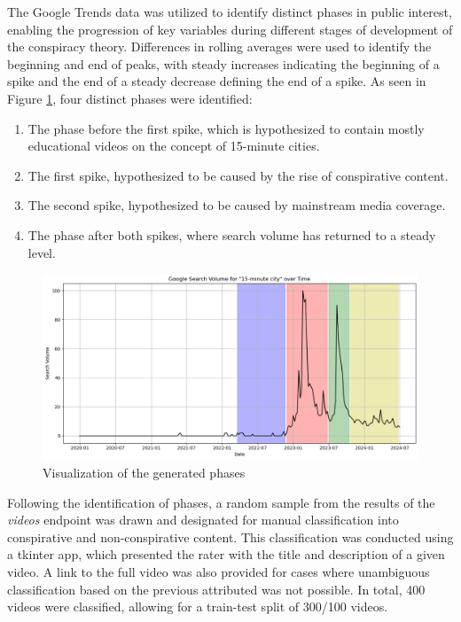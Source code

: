 \documentclass[fontsize=11pt, parskip=half]{scrartcl}
\begin{document}
    The Google Trends data  was utilized to identify distinct phases in public interest, enabling the progression of key variables during different stages of development of the conspiracy theory. Differences in rolling averages were used to identify the beginning and end of peaks, with steady increases indicating the beginning of a spike and the end of a steady decrease defining the end of a spike. As seen in Figure \ref{fig:gtrends_phases}, four distinct phases were identified: 
    \begin{enumerate}
        \item The phase before the first spike, which is hypothesized to contain mostly educational videos on the concept of 15-minute cities.
        \item The first spike, hypothesized to be caused by the rise of conspirative content.
        \item The second spike, hypothesized to be caused by mainstream media coverage.
        \item The phase after both spikes, where search volume has returned to a steady level.
    \end{enumerate}

    \begin{figure}{}
        \centering
        \setlength\intextsep{0pt}
        \includegraphics[width=0.8 \textwidth]{img/gtrends_phases.png}
        \vspace{-5pt}
        \caption{Visualization of the generated phases}
        \vspace{-10pt}
        \label{fig:gtrends_phases}
    \end{figure}

    Following the identification of phases, a random sample from the results of the \textit{videos} endpoint was drawn and designated for manual classification into conspirative and non-conspirative content. This classification was conducted using a tkinter app, which presented the rater with the title and description of a given video. A link to the full video was also provided for cases where unambiguous classification based on the previous attributed was not possible. In total, 400 videos were classified, allowing for a train-test split of 300/100 videos.
\end{document}
